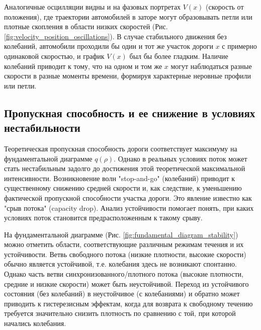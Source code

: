 \documentclass[12pt, a4paper]{article}
\begin{document}
Аналогичные осцилляции видны и на фазовых портретах $V(x)$ (скорость от положения), где траектории автомобилей в заторе могут образовывать петли или плотные скопления в области низких скоростей (Рис. \ref{fig:velocity_position_oscillations}). В случае стабильного движения без колебаний, автомобили проходили бы один и тот же участок дороги $x$ с примерно одинаковой скоростью, и график $V(x)$ был бы более гладким. Наличие колебаний приводит к тому, что на одном и том же $x$ могут наблюдаться разные скорости в разные моменты времени, формируя характерные неровные профили или петли.



\subsection{Пропускная способность и ее снижение в условиях нестабильности}
\label{subsec:capacity_reduction}

Теоретическая пропускная способность дороги соответствует максимуму на фундаментальной диаграмме $q(\rho)$. Однако в реальных условиях поток может стать нестабильным задолго до достижения этой теоретической максимальной интенсивности. Возникновение волн "stop-and-go" (колебаний) приводит к существенному снижению средней скорости и, как следствие, к уменьшению фактической пропускной способности участка дороги. Это явление известно как "срыв потока" (capacity drop).
Анализ устойчивости помогает понять, при каких условиях поток становится предрасположенным к такому срыву.

На фундаментальной диаграмме (Рис. \ref{fig:fundamental_diagram_stability}) можно отметить области, соответствующие различным режимам течения и их устойчивости. Ветвь свободного потока (низкие плотности, высокие скорости) обычно является устойчивой, т.е. колебания здесь не возникают спонтанно. Однако часть ветви синхронизованного/плотного потока (высокие плотности, средние и низкие скорости) может быть неустойчивой. Переход из устойчивого состояния (без колебаний) в неустойчивое (с колебаниями) и обратно может приводить к гистерезисным эффектам, когда для возврата к свободному течению требуется значительно снизить плотность по сравнению с той, при которой начались колебания.
\end{document}
